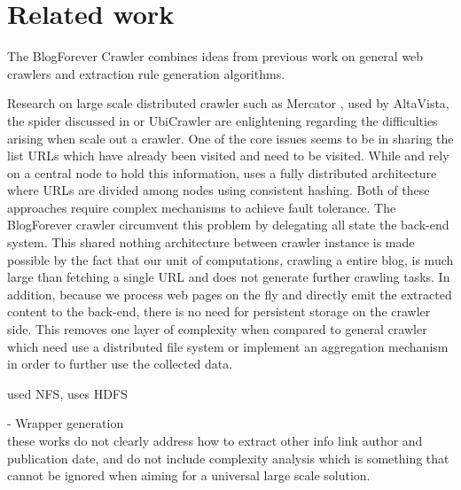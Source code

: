 \section{Related work}


The BlogForever Crawler combines ideas from previous work on general web crawlers and extraction rule generation algorithms.

Research on large scale distributed crawler such as Mercator \cite{najork2001}, used by AltaVista, the spider discussed in \cite{shkapenyuk2002} or UbiCrawler \cite{boldi2003} are enlightening regarding the difficulties arising when scale out a crawler. One of the core issues seems to be in sharing the list URLs which have already been visited and need to be visited. While \cite{najork2001} and \cite{shkapenyuk2002} rely on a central node to hold this information, \cite{boldi2003} uses a fully distributed architecture where URLs are divided among nodes using consistent hashing. Both of these approaches require complex mechanisms to achieve fault tolerance. The BlogForever crawler circumvent this problem by delegating all state the back-end system. This shared nothing architecture between crawler instance is made possible by the fact that our unit of computations, crawling a entire blog, is much large than fetching a single URL and does not generate further crawling tasks. In addition, because we process web pages on the fly and directly emit the extracted content to the back-end, there is no need for persistent storage on the crawler side. This removes one layer of complexity when compared to general crawler which need use a distributed file system or implement an aggregation mechanism in order to further use the collected data.

\cite{shkapenyuk2002} used NFS, \cite{berger2011} uses HDFS

- Wrapper generation\\
these works do not clearly address how to extract other info link author and publication date, and do not include complexity analysis which is something that cannot be ignored when aiming for a universal large scale solution.


